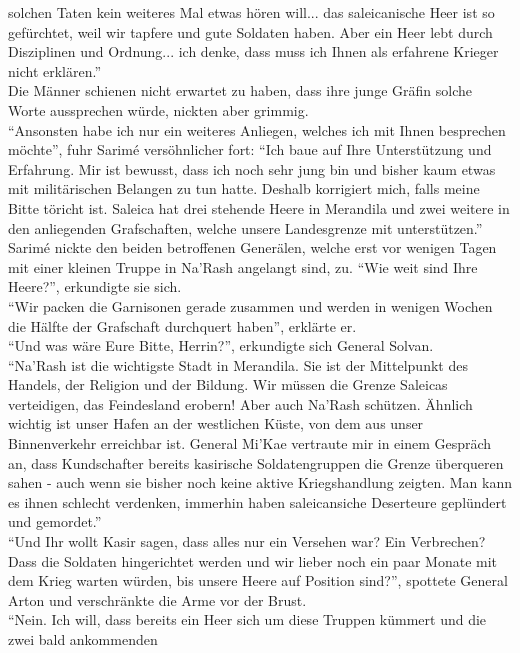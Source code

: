 solchen Taten kein weiteres Mal etwas hören will... das saleicanische Heer ist so gefürchtet, weil 
wir tapfere und gute Soldaten haben. Aber ein Heer lebt durch Disziplinen und Ordnung... ich denke, 
dass muss ich Ihnen als erfahrene Krieger nicht erklären.''\\
Die Männer schienen nicht erwartet zu haben, dass ihre junge Gräfin solche Worte aussprechen würde, 
nickten aber grimmig.\\
``Ansonsten habe ich nur ein weiteres Anliegen, welches ich mit Ihnen besprechen möchte'', fuhr 
Sarimé versöhnlicher fort: ``Ich baue auf Ihre Unterstützung und Erfahrung. Mir ist bewusst, dass 
ich noch sehr jung bin und bisher kaum etwas mit militärischen Belangen zu tun hatte. Deshalb 
korrigiert mich, falls meine Bitte töricht ist. Saleica hat drei stehende Heere in Merandila und 
zwei weitere in den anliegenden Grafschaften, welche unsere Landesgrenze mit unterstützen.''\\
Sarimé nickte den beiden betroffenen Generälen, welche erst vor wenigen Tagen mit einer kleinen 
Truppe in Na'Rash angelangt sind, zu. ``Wie weit sind Ihre Heere?'', erkundigte sie sich.\\
``Wir packen die Garnisonen gerade zusammen und werden in wenigen Wochen die Hälfte der Grafschaft 
durchquert haben'', erklärte er.\\
``Und was wäre Eure Bitte, Herrin?'', erkundigte sich General Solvan.\\
``Na'Rash ist die wichtigste Stadt in Merandila. Sie ist der Mittelpunkt des Handels, der Religion 
und der Bildung. Wir müssen die Grenze Saleicas verteidigen, das Feindesland erobern! Aber auch 
Na'Rash schützen. Ähnlich wichtig ist unser Hafen an der westlichen Küste, von dem aus unser 
Binnenverkehr erreichbar ist. General Mi'Kae vertraute mir in einem Gespräch an, dass Kundschafter 
bereits kasirische Soldatengruppen die Grenze überqueren sahen - auch wenn sie bisher noch keine 
aktive Kriegshandlung zeigten. Man kann es ihnen schlecht verdenken, immerhin haben saleicansiche 
Deserteure geplündert und gemordet.''\\
``Und Ihr wollt Kasir sagen, dass alles nur ein Versehen war? Ein Verbrechen? Dass die Soldaten 
hingerichtet werden und wir lieber noch ein paar Monate mit dem Krieg warten würden, bis unsere 
Heere auf Position sind?'', spottete General Arton und verschränkte die Arme vor der Brust.\\
``Nein. Ich will, dass bereits ein Heer sich um diese Truppen kümmert und die zwei bald ankommenden 

